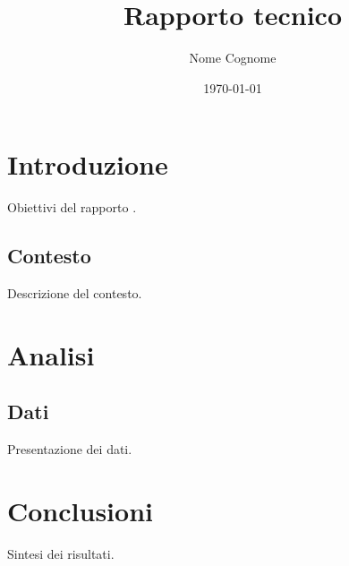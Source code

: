 \documentclass[11pt,a4paper]{report}
\title{Rapporto tecnico}
\author{Nome Cognome}
\date{\today}
\begin{document}
\maketitle
\tableofcontents

\chapter{Introduzione}
Obiettivi del rapporto \cite{lamport1994}.

\section{Contesto}
Descrizione del contesto.

\chapter{Analisi}
\section{Dati}
Presentazione dei dati.

\chapter{Conclusioni}
Sintesi dei risultati.



\end{document}
